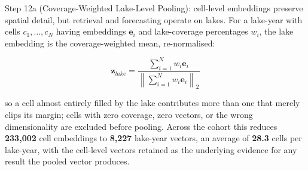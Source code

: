 \documentclass[12pt,a4paper,oneside]{report}
\begin{document}
\label{sec:pooling}

Step 12a (Coverage-Weighted Lake-Level Pooling): cell-level
embeddings preserve spatial detail, but retrieval and
forecasting operate on lakes. For a lake-year with cells
$c_1,\dots,c_N$ having embeddings $\mathbf{e}_i$ and lake-coverage
percentages $w_i$, the lake embedding is the coverage-weighted mean,
re-normalised:

\begin{equation}
\mathbf{z}_{lake}
=
\frac{\sum_{i=1}^{N} w_i \mathbf{e}_i}
{\left\|\sum_{i=1}^{N} w_i \mathbf{e}_i\right\|_2}
\end{equation}

so a cell almost entirely filled by the lake contributes more than
one that merely clips its margin; cells with zero coverage, zero
vectors, or the wrong dimensionality are excluded before pooling.
Across the cohort this reduces \textbf{233{,}002} cell embeddings to
\textbf{8{,}227} lake-year vectors, an average of \textbf{28.3} cells
per lake-year, with the cell-level vectors retained as the
underlying evidence for any result the pooled vector produces.
\end{document}
